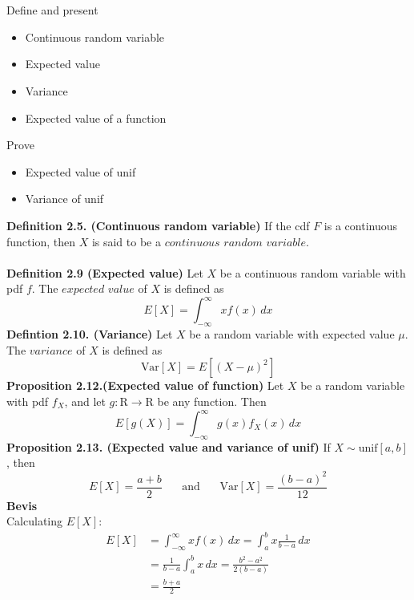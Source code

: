 \documentclass[12pt,a4paper]{report}
\author{Frederik Appel Vardinghus-Nielsen}
\begin{document}
\\\\
Define and present
\begin{itemize}
\setlength\itemsep{0em}
\item Continuous random variable
\item Expected value
\item Variance
\item Expected value of a function
\end{itemize}
Prove
\begin{itemize}
\setlength\itemsep{0em}
\item Expected value of unif
\item Variance of unif
\end{itemize}
\textbf{Definition 2.5. (Continuous random variable)} If the cdf $F$ is a continuous function, then $X$ is said to be a $continuous$ $random$ $variable$.\\\\
\textbf{Definition 2.9 (Expected value)} Let $X$ be a continuous random variable with pdf $f$. The $expected$ $value$ of $X$ is defined as
\begin{equation}
E[X]=\int_{-\infty}^{\infty}\!xf(x)\,dx
\end{equation}
\textbf{Defintion 2.10. (Variance)} Let $X$ be a random variable with expected value $\mu$. The $variance$ of $X$ is defined as
\begin{equation}
\text{Var}[X]=E[(X-\mu)^2]
\end{equation}
\textbf{Proposition 2.12.(Expected value of function)} Let $X$ be a random variable with pdf $f_X$, and let $g:\mathrm{R}\to\mathrm{R}$ be any function. Then
\begin{equation}
E[g(X)]=\int_{-\infty}^{\infty}\!g(x)f_X(x)\,dx
\end{equation}
\textbf{Proposition 2.13. (Expected value and variance of unif)} If $X\sim\text{unif}[a,b]$, then
\begin{equation}
E[X]=\frac{a+b}{2}\phantom{mm}\text{and}\phantom{mm}\text{Var}[X]=\frac{(b-a)^2}{12}
\end{equation}
\textbf{Bevis}\\
Calculating $E[X]$:
\begin{align*}
E[X]&=\int_{-\infty}^{\infty}\!xf(x)\,dx=\int_a^b\!x\frac{1}{b-a}\,dx\\
&=\frac{1}{b-a}\int_a^b\!x\,dx=\frac{b^2-a^2}{2(b-a)}\\
&=\frac{b+a}{2}
\end{align*}
\end{document}
